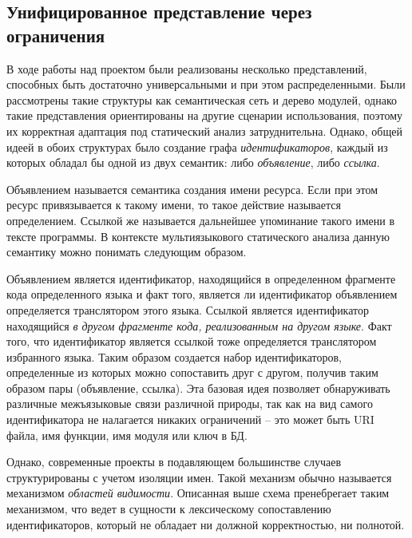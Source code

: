 \subsection{Унифицированное представление через ограничения}

В ходе работы над проектом были реализованы несколько представлений, способных быть достаточно универсальными
и при этом распределенными. Были рассмотрены такие структуры как семантическая сеть и дерево модулей, однако
такие представления ориентированы на другие сценарии использования, поэтому их корректная
адаптация под статический анализ затруднительна. Однако, общей идеей в обоих структурах было 
создание графа \textit{идентификаторов}, каждый из которых обладал бы одной из двух
семантик: либо \textit{объявление}, либо \textit{ссылка}.

Объявлением называется семантика создания имени ресурса. Если при этом ресурс привязывается к такому имени, то
такое действие называется определением. Ссылкой же называется дальнейшее упоминание такого имени в тексте
программы. В контексте мультиязыкового статического анализа данную семантику можно понимать следующим образом.

Объявлением является идентификатор, находящийся в определенном фрагменте кода определенного языка и факт того, является
ли идентификатор объявлением определяется транслятором этого языка. Ссылкой является идентификатор находящийся \textit{в
другом фрагменте кода, реализованным на другом языке}. Факт того, что идентификатор является ссылкой тоже определяется
транслятором избранного языка. Таким образом создается набор идентификаторов, определенные из которых можно сопоставить друг
с другом, получив таким образом пары (объявление, ссылка).
Эта базовая идея позволяет обнаруживать различные межъязыковые связи различной природы, так как на вид самого идентификатора
не налагается никаких ограничений -- это может быть URI файла, имя функции, имя модуля или ключ в БД.

Однако, современные проекты в подавляющем большинстве случаев структурированы с учетом изоляции имен. Такой механизм
обычно называется механизмом \textit{областей видимости}. Описанная выше схема пренебрегает таким механизмом, что
ведет в сущности к лексическому сопоставлению идентификаторов, который не обладает ни должной корректностью, ни полнотой.

